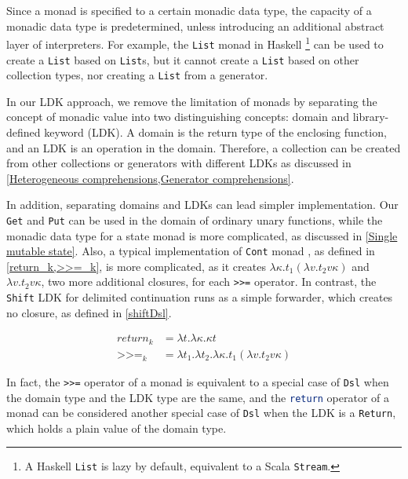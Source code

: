 Since a monad is specified to a certain monadic data type, the capacity of a monadic data type is predetermined, unless introducing an additional abstract layer of interpreters. For example, the \lstinline{List} monad in Haskell \footnote{A Haskell \lstinline{List} is lazy by default, equivalent to a Scala \lstinline{Stream}.} can be used to create a \lstinline{List} based on \lstinline{List}s, but it cannot create a \lstinline{List} based on other collection types, nor creating a \lstinline{List} from a generator.

In our LDK approach, we remove the limitation of monads by separating the concept of monadic value into two distinguishing concepts: domain and library-defined keyword (LDK). A domain is the return type of the enclosing function, and an LDK is an operation in the domain. Therefore, a collection can be created from other collections or generators with different LDKs as discussed in \cref{Heterogeneous comprehensions,Generator comprehensions}. 

In addition, separating domains and LDKs can lead simpler implementation. Our \lstinline{Get} and \lstinline{Put} can be used in the domain of ordinary unary functions, while the monadic data type for a state monad is more complicated, as discussed in \cref{Single mutable state}. Also, a typical implementation of \lstinline{Cont} monad \cite{dyvbig2007monadic}, as defined in \cref{return_k,>>=_k}, is more complicated, as it creates $\lambda\kappa.t_1\left(\lambda v.t_2 v\kappa\right)$ and $\lambda v.t_2 v\kappa$, two more additional closures, for each \lstinline{>>=} operator. In contrast, the \lstinline{Shift} LDK for delimited continuation runs as a simple forwarder, which creates no closure, as defined in \cref{shiftDsl}.

\begin{align}
\label{return_k}
return_k &= \lambda t.\lambda \kappa.\kappa t\\
\label{>>=_k}
\texttt{>>=}_k &= \lambda t_1.\lambda t_2.\lambda \kappa.t_1\left(\lambda v.t_2 v\kappa\right)
\end{align}

In fact, the \lstinline{>>=} operator of a monad is equivalent to a special case of \lstinline{Dsl} when the domain type and the LDK type are the same, and the \lstinline[language=Haskell,deletekeywords={return}]{return} operator of a monad can be considered another special case of \lstinline{Dsl} when the LDK is a \lstinline{Return}, which holds a plain value of the domain type.

